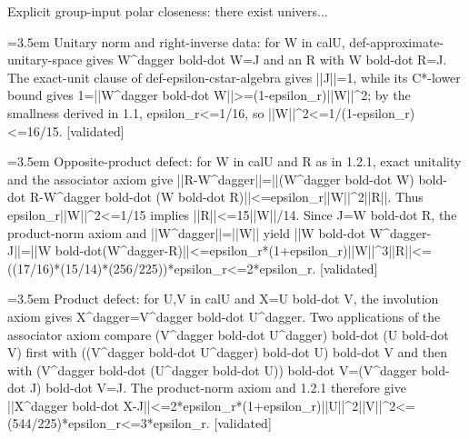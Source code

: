 \documentclass{article}
\newcommand{\step}[1]{\par\noindent\hangindent=3.5em\hangafter=1%
  \makebox[3.5em][l]{\textbf{#1.}}}
\newcommand{\steptag}[1]{\hfill{\small\textsf{[#1]}}}
\begin{document}
\begin{proofbox}{Explicit group-input polar closeness: there exist univers...}
\step{1.2.1} Unitary norm and right-inverse data: for W in calU, def-approximate-unitary-space gives W\textasciicircum{}dagger bold-dot W=J and an R with W bold-dot R=J. The exact-unit clause of def-epsilon-cstar-algebra gives ||J||=1, while its C*-lower bound gives 1=||W\textasciicircum{}dagger bold-dot W||>=(1-epsilon\_r)||W||\textasciicircum{}2; by the smallness derived in 1.1, epsilon\_r<=1/16, so ||W||\textasciicircum{}2<=1/(1-epsilon\_r)<=16/15. \steptag{validated} \\[4pt]
\step{1.2.2} Opposite-product defect: for W in calU and R as in 1.2.1, exact unitality and the associator axiom give ||R-W\textasciicircum{}dagger||=||(W\textasciicircum{}dagger bold-dot W) bold-dot R-W\textasciicircum{}dagger bold-dot (W bold-dot R)||<=epsilon\_r||W||\textasciicircum{}2||R||. Thus epsilon\_r||W||\textasciicircum{}2<=1/15 implies ||R||<=15||W||/14. Since J=W bold-dot R, the product-norm axiom and ||W\textasciicircum{}dagger||=||W|| yield ||W bold-dot W\textasciicircum{}dagger-J||=||W bold-dot(W\textasciicircum{}dagger-R)||<=epsilon\_r*(1+epsilon\_r)||W||\textasciicircum{}3||R||<=((17/16)*(15/14)*(256/225))*epsilon\_r<=2*epsilon\_r. \steptag{validated} \\[4pt]
\step{1.2.3} Product defect: for U,V in calU and X=U bold-dot V, the involution axiom gives X\textasciicircum{}dagger=V\textasciicircum{}dagger bold-dot U\textasciicircum{}dagger. Two applications of the associator axiom compare (V\textasciicircum{}dagger bold-dot U\textasciicircum{}dagger) bold-dot (U bold-dot V) first with ((V\textasciicircum{}dagger bold-dot U\textasciicircum{}dagger) bold-dot U) bold-dot V and then with (V\textasciicircum{}dagger bold-dot (U\textasciicircum{}dagger bold-dot U)) bold-dot V=(V\textasciicircum{}dagger bold-dot J) bold-dot V=J. The product-norm axiom and 1.2.1 therefore give ||X\textasciicircum{}dagger bold-dot X-J||<=2*epsilon\_r*(1+epsilon\_r)||U||\textasciicircum{}2||V||\textasciicircum{}2<=(544/225)*epsilon\_r<=3*epsilon\_r. \steptag{validated} \\[6pt]

\end{proofbox}
\end{document}
